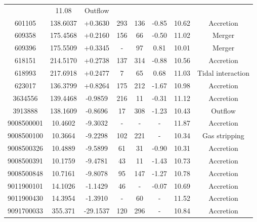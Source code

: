 \documentclass[fleqn,usenatbib]{mnras}
\begin{document}
\begin{table}
\begin{tabular*}{\linewidth}{cccccccc}
& 11.08%
& Outflow            \\
601105                    & 138.6037 & +0.3630  & 293                           & 136                         & -0.85%
& 10.62%
& Accretion          \\
609358                    & 175.4568 & +0.2160  & 156                           & 66                          & -0.50%
& 11.02%
& Merger             \\
609396                    & 175.5509 & +0.3345  & -                             & 97                          & 0.81%
& 10.01%
& Merger             \\
618151                    & 214.5170 & +0.2738  & 137                           & 314                         & -0.88%
& 10.56%
& Accretion          \\
618993                    & 217.6918 & +0.2477  & 7                             & 65                          & 0.68%
& 11.03%
& Tidal interaction  \\
623017                    & 136.3799 & +0.8264  & 175                           & 212                         & -1.67%
& 10.98%
& Accretion          \\
3634556                   & 139.4468 & -0.9859  & 216                           & 11                          & -0.31%
& 11.12%
& Accretion          \\
3913888                   & 138.1609 & -0.8696  & 17                            & 308                         & -1.23%
& 10.43%
& Outflow            \\
9008500001                & 10.4602  & -9.3032  & -                             & -                           & - & 11.87%
& Accretion          \\
9008500100                & 10.3664  & -9.2298  & 102                           & 221                         & - & 10.34%
& Gas stripping      \\
9008500326                & 10.4889  & -9.5899  & 61                            & 31                          & -0.90%
& 10.31%
& Accretion          \\
9008500391                & 10.1759  & -9.4781  & 43                            & 11                          & -1.43%
& 10.73%
& Accretion          \\
9008500848                & 10.7161  & -9.8078  & 95                            & 147                         & -1.27%
& 10.78%
& Accretion          \\
9011900101                & 14.1026  & -1.1429  & 46                            & -                           & -0.07%
& 10.69%
& Accretion          \\
9011900430                & 14.3954  & -1.3910  & -                             & 60                          & - & 11.52%
& Accretion          \\
9091700033                & 355.371  & -29.1537 & 120                           & 296                         & - & 10.84 & Accretion         


\end{tabular*}
\end{table}
\end{document}
